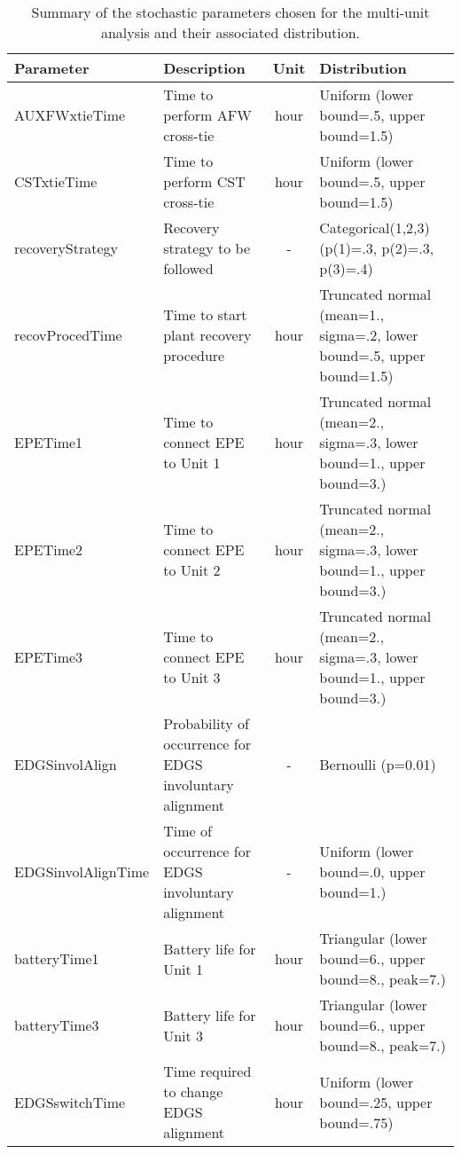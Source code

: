 \begin{table}
  \centering
  \begin{center}
      \begin{tabular}{ | l | p{5cm} | c | p{5cm} |}
        \hline
         \textbf{Parameter}          & \textbf{Description}                      & \textbf{Unit}   & \textbf{Distribution}                                         \\ \hline \hline
         AUXFWxtieTime      & Time to perform AFW cross-tie    & hour   & Uniform (lower bound=.5, upper bound=1.5)            \\ \hline
         CSTxtieTime        & Time to perform CST cross-tie    & hour   & Uniform (lower bound=.5, upper bound=1.5)            \\ \hline
         recoveryStrategy   & Recovery strategy to be followed & -      & Categorical(1,2,3) (p(1)=.3, p(2)=.3, p(3)=.4)       \\ \hline
         recovProcedTime    & Time to start plant recovery procedure    & hour        & Truncated normal (mean=1., sigma=.2, lower bound=.5, upper bound=1.5)       \\ \hline
         EPETime1           & Time to connect EPE to Unit 1    & hour   & Truncated normal (mean=2., sigma=.3, lower bound=1., upper bound=3.)   \\ \hline
         EPETime2           & Time to connect EPE to Unit 2    & hour   & Truncated normal (mean=2., sigma=.3, lower bound=1., upper bound=3.)   \\ \hline
         EPETime3           & Time to connect EPE to Unit 3    & hour   & Truncated normal (mean=2., sigma=.3, lower bound=1., upper bound=3.)   \\ \hline
         EDGSinvolAlign     & Probability of occurrence for EDGS involuntary alignment & -      & Bernoulli (p=0.01)                               \\ \hline
         EDGSinvolAlignTime & Time of occurrence for EDGS involuntary alignment        & -      & Uniform (lower bound=.0, upper bound=1.)       \\ \hline
         batteryTime1       & Battery life for Unit 1          & hour      & Triangular (lower bound=6., upper bound=8., peak=7.) \\ \hline
         batteryTime3       & Battery life for Unit 3          & hour      & Triangular (lower bound=6., upper bound=8., peak=7.) \\ \hline
         EDGSswitchTime     & Time required to change EDGS alignment       & hour  & Uniform (lower bound=.25, upper bound=.75)                  \\ 
        \hline
      \end{tabular}
  \end{center}
  \caption{Summary of the stochastic parameters chosen for the multi-unit analysis and their associated distribution.}
  \label{tab:stochasticParameters1}
\end{table}

